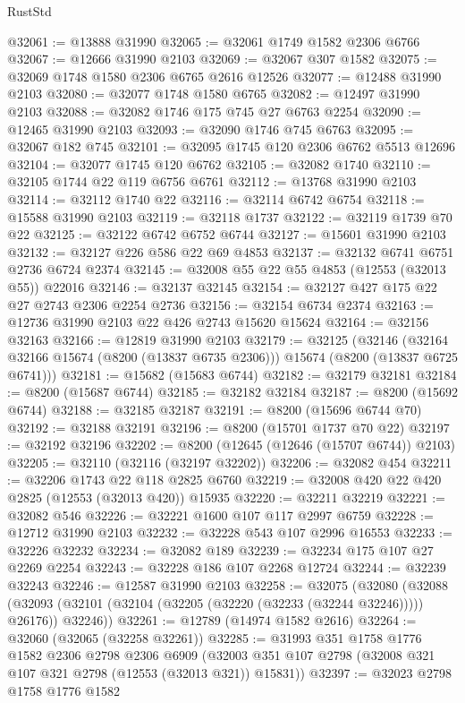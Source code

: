 \begin{lexlean}{RustStd}
\begin{coremodule}
@32061 := @13888 @31990
@32065 := @32061 @1749 @1582 @2306 @6766
@32067 := @12666 @31990 @2103
@32069 := @32067 @307 @1582
@32075 := @32069 @1748 @1580 @2306 @6765 @2616 @12526
@32077 := @12488 @31990 @2103
@32080 := @32077 @1748 @1580 @6765
@32082 := @12497 @31990 @2103
@32088 := @32082 @1746 @175 @745 @27 @6763 @2254
@32090 := @12465 @31990 @2103
@32093 := @32090 @1746 @745 @6763
@32095 := @32067 @182 @745
@32101 := @32095 @1745 @120 @2306 @6762 @5513 @12696
@32104 := @32077 @1745 @120 @6762
@32105 := @32082 @1740
@32110 := @32105 @1744 @22 @119 @6756 @6761
@32112 := @13768 @31990 @2103
@32114 := @32112 @1740 @22
@32116 := @32114 @6742 @6754
@32118 := @15588 @31990 @2103
@32119 := @32118 @1737
@32122 := @32119 @1739 @70 @22
@32125 := @32122 @6742 @6752 @6744
@32127 := @15601 @31990 @2103
@32132 := @32127 @226 @586 @22 @69 @4853
@32137 := @32132 @6741 @6751 @2736 @6724 @2374
@32145 := @32008 @55 @22 @55 @4853 (@12553 (@32013 @55)) @22016
@32146 := @32137 @32145
@32154 := @32127 @427 @175 @22 @27 @2743 @2306 @2254 @2736
@32156 := @32154 @6734 @2374
@32163 := @12736 @31990 @2103 @22 @426 @2743 @15620 @15624
@32164 := @32156 @32163
@32166 := @12819 @31990 @2103
@32179 := @32125
    (@32146 (@32164 @32166 @15674 (@8200 (@13837 @6735 @2306))) @15674 (@8200 (@13837 @6725 @6741)))
@32181 := @15682 (@15683 @6744)
@32182 := @32179 @32181
@32184 := @8200 (@15687 @6744)
@32185 := @32182 @32184
@32187 := @8200 (@15692 @6744)
@32188 := @32185 @32187
@32191 := @8200 (@15696 @6744 @70)
@32192 := @32188 @32191
@32196 := @8200 (@15701 @1737 @70 @22)
@32197 := @32192 @32196
@32202 := @8200 (@12645 (@12646 (@15707 @6744)) @2103)
@32205 := @32110 (@32116 (@32197 @32202))
@32206 := @32082 @454
@32211 := @32206 @1743 @22 @118 @2825 @6760
@32219 := @32008 @420 @22 @420 @2825 (@12553 (@32013 @420)) @15935
@32220 := @32211 @32219
@32221 := @32082 @546
@32226 := @32221 @1600 @107 @117 @2997 @6759
@32228 := @12712 @31990 @2103
@32232 := @32228 @543 @107 @2996 @16553
@32233 := @32226 @32232
@32234 := @32082 @189
@32239 := @32234 @175 @107 @27 @2269 @2254
@32243 := @32228 @186 @107 @2268 @12724
@32244 := @32239 @32243
@32246 := @12587 @31990 @2103
@32258 := @32075
    (@32080
      (@32088 (@32093 (@32101 (@32104 (@32205 (@32220 (@32233 (@32244 @32246))))) @26176)) @32246))
@32261 := @12789 (@14974 @1582 @2616)
@32264 := @32060 (@32065 (@32258 @32261))
@32285 := @31993
    @351
    @1758
    @1776
    @1582
    @2306
    @2798
    @2306
    @6909
    (@32003 @351 @107 @2798 (@32008 @321 @107 @321 @2798 (@12553 (@32013 @321)) @15831))
@32397 := @32023
    @2798
    @1758
    @1776
    @1582

\end{coremodule}
\end{lexlean}
